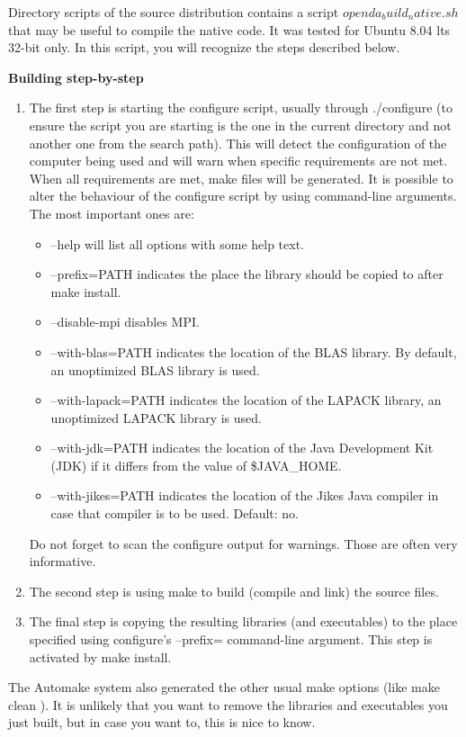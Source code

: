 Directory scripts of the source distribution contains a script $openda_build_native.sh$ that may be useful to compile the native code. It was tested for Ubuntu 8.04 lts 32-bit only. In this script, you will recognize the steps described below.

\textbf{Building step-by-step}

\begin{enumerate}
	\item The first step is starting the configure script, usually through ./configure (to ensure the script you are starting is the one in the current directory and not another one from the search path). This will detect the configuration of the computer being used and will warn when specific requirements are not met. When all requirements are met, make files will be generated. It is possible to alter the behaviour of the configure script by using command-line arguments. The most important ones are: 
	\begin{itemize}
		\item --help will list all options with some help text.
		\item --prefix=PATH indicates the place the library should be copied to after make install.
		\item --disable-mpi disables MPI.
		\item --with-blas=PATH indicates the location of the BLAS library. By default, an unoptimized BLAS library is used.
		\item --with-lapack=PATH indicates the location of the LAPACK library, an unoptimized LAPACK library is used.
		\item --with-jdk=PATH indicates the location of the Java Development Kit (JDK) if it differs from the value of \$JAVA\_HOME.
		\item --with-jikes=PATH indicates the location of the Jikes Java compiler in case that compiler is to be used. Default: no.
	\end{itemize}
	Do not forget to scan the configure output for warnings. Those are often very informative. 
\item The second step is using make to build (compile and link) the source files.
\item The final step is copying the resulting libraries (and executables) to the place specified using configure's --prefix= command-line argument. This step is activated by make install. 
\end{enumerate}

The Automake system also generated the other usual make options (like make clean ). It is unlikely that you want to remove the libraries and executables you just built, but in case you want to, this is nice to know. 


